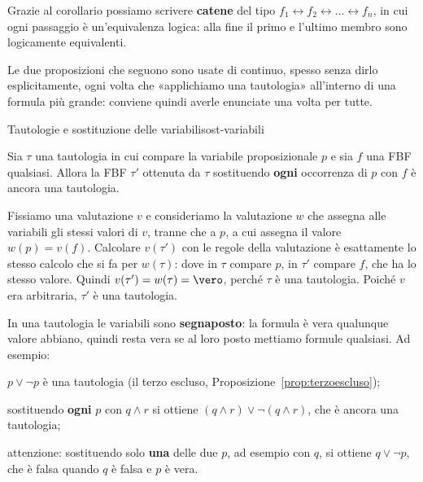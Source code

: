 Grazie al corollario possiamo scrivere \textbf{catene} del tipo $f_1 \leftrightarrow f_2 \leftrightarrow \dots \leftrightarrow f_n$,
in cui ogni passaggio è un'equivalenza logica: alla fine il primo e l'ultimo membro sono logicamente equivalenti.

Le due proposizioni che seguono sono usate di continuo, spesso senza dirlo esplicitamente, ogni volta che
«applichiamo una tautologia» all'interno di una formula più grande: conviene quindi averle enunciate una volta per tutte.

\begin{concetto}
\begin{Proposizione}{Tautologie e sostituzione delle variabili}{sost-variabili}
    \begin{prerequisiti}
    \end{prerequisiti}
    Sia $\tau$ una tautologia in cui compare la variabile proposizionale $p$ e sia $f$ una FBF qualsiasi.
    Allora la FBF $\tau'$ ottenuta da $\tau$ sostituendo \textbf{ogni} occorrenza di $p$ con $f$ è ancora una tautologia.
\end{Proposizione}

\begin{dimostrazione}
    Fissiamo una valutazione $v$ e consideriamo la valutazione $w$ che assegna alle variabili gli stessi valori di $v$,
    tranne che a $p$, a cui assegna il valore $w(p) = v(f)$. Calcolare $v(\tau')$ con le regole della valutazione
    è esattamente lo stesso calcolo che si fa per $w(\tau)$: dove in $\tau$ compare $p$, in $\tau'$ compare $f$,
    che ha lo stesso valore. Quindi $v(\tau') = w(\tau) = \vero$, perché $\tau$ è una tautologia.
    Poiché $v$ era arbitraria, $\tau'$ è una tautologia.
\end{dimostrazione}
\end{concetto}

\begin{spiegazione}
    In una tautologia le variabili sono \textbf{segnaposto}: la formula è vera qualunque valore abbiano, quindi resta vera se al loro posto
    mettiamo formule qualsiasi. Ad esempio:
    \begin{passi}
        \item $p \vee \neg p$ è una tautologia (il terzo escluso, Proposizione~\ref{prop:terzoescluso});
        \item sostituendo \textbf{ogni} $p$ con $q \wedge r$ si ottiene $(q \wedge r) \vee \neg(q \wedge r)$, che è ancora una tautologia;
        \item attenzione: sostituendo solo \textbf{una} delle due $p$, ad esempio con $q$, si ottiene $q \vee \neg p$, che è falsa quando $q$ è falsa e $p$ è vera.
    \end{passi}
\end{spiegazione}


